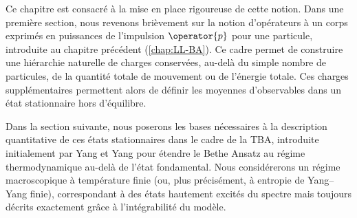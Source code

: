 \medskip

Ce chapitre est consacré à la mise en place rigoureuse de cette notion.  
Dans une première section, nous revenons brièvement sur la notion d’opérateurs à un corps exprimés en puissances de l’impulsion $\operator{p}$ pour une particule, introduite au chapitre précédent (\ref{chap:LL-BA}).  
Ce cadre permet de construire une hiérarchie naturelle de charges conservées, au-delà du simple nombre de particules, de la quantité totale de mouvement ou de l’énergie totale.  
Ces charges supplémentaires permettent alors de définir les moyennes d'observables dans un état stationnaire hors d'équilibre.

\medskip


Dans la section suivante, nous poserons les bases nécessaires à la description quantitative de ces états stationnaires dans le cadre de la \gls{TBA}, introduite initialement par Yang et Yang \cite{YangYang_1969} pour étendre le Bethe Ansatz au régime thermodynamique au-delà de l’état fondamental. Nous considérerons un régime macroscopique à température finie (ou, plus précisément, à entropie de Yang–Yang finie), correspondant à des états hautement excités du spectre mais toujours décrits exactement grâce à l’intégrabilité du modèle.


